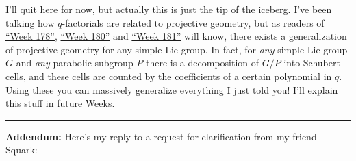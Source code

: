 \documentclass{article}
\begin{document}
I'll quit here for now, but actually this is just the tip of the
iceberg. I've been talking how \(q\)-factorials are related to
projective geometry, but as readers of
\protect\hyperlink{week178}{``Week 178''},
\protect\hyperlink{week180}{``Week 180''} and
\protect\hyperlink{week181}{``Week 181''} will know, there exists a
generalization of projective geometry for any simple Lie group. In fact,
for \emph{any} simple Lie group \(G\) and \emph{any} parabolic subgroup
\(P\) there is a decomposition of \(G/P\) into Schubert cells, and these
cells are counted by the coefficients of a certain polynomial in \(q\).
Using these you can massively generalize everything I just told you!
I'll explain this stuff in future Weeks.

\begin{center}\rule{0.5\linewidth}{0.5pt}\end{center}

\textbf{Addendum:} Here's my reply to a request for clarification from
my friend Squark:
\end{document}
